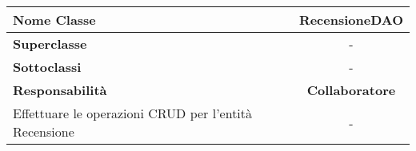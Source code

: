 
\setcounter{table}{0}
\begin{table}[H]
    \centering
    \begin{tabular}{||   l  ||  c   ||}
        \rowcolor{Gray}
        \hline
        \textbf{Nome Classe} & RecensioneDAO\\
        \hline
        \textbf{Superclasse}  &  - \\
        \hline
        \textbf{Sottoclassi} & - \\
        \hline
        \hline
         \textbf{Responsabilità} & \textbf{Collaboratore} \\
         \hline
          Effettuare le operazioni \gls{CRUD} per l'entità Recensione & - \\
         \hline
    \end{tabular}
\end{table}

    
       
